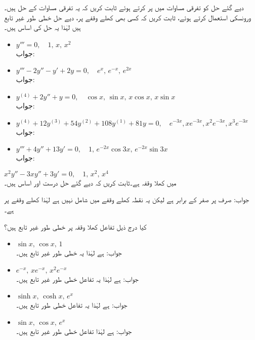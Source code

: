 دیے گئے حل کو تفرقی مساوات میں پر کرتے ہوئے ثابت کریں کہ یہ تفرقی مساوات کے حل ہیں۔ورونسکی استعمال کرتے ہوئے، ثابت کریں کہ کسی بھی کھلے وقفے پر،  دیے حل خطی طور غیر تابع ہیں لہٰذا یہ حل کی اساس ہیں۔
\begin{itemize}
\item
$y'''=0,\quad 1,\, x,\, x^2$\\
جواب: 
\item
$y'''-2y''-y'+2y=0,\quad e^{x},\,  e^{-x},\, e^{2x}$\\
جواب:
\item
$y^{(4)}+2y''+y=0,\quad \cos x,\, \sin x,\, x\cos x,\, x\sin x$\\
جواب:
\item
$y^{(4)}+12y^{(3)}+54y^{(2)}+108y^{(1)}+81y=0, \quad e^{-3x},xe^{-3x},x^2e^{-3x},x^3e^{-3x}$\\
جواب:
\item
$y'''+4y''+13y'=0,\quad 1, \, e^{-2x}\cos 3x, \, e^{-2x} \sin 3x$\\
جواب:
\end{itemize}
\quad 
$x^2y''-3xy''+3y'=0,\quad 1,\, x^2,\,x^4$\\
میں  کھلا وقفہ  ہے۔ثابت کریں کہ دیے گئے حل درست  اور اساس ہیں۔

جواب: صرف  پر صفر کے برابر ہے لیکن یہ نقطہ کھلے وقفے میں شامل نہیں ہے لہٰذا کھلے وقفے پر  ہے۔

کیا درج ذیل تفاعل کھلا وقفہ  پر خطی طور غیر تابع ہیں؟
\begin{itemize}

\item
$\sin x, \, \cos x, \, 1$\\
جواب: ہے لہٰذا یہ خطی طور غیر تابع ہیں۔
\item
$e^{-x},\, xe^{-x}, \, x^2e^{-x}$\\
جواب: ہے لہٰذا یہ تفاعل خطی طور غیر تابع ہیں۔
\item
$\sinh x, \, \cosh x, \, e^{x}$\\
جواب: ہے لہٰذا یہ تفاعل خطی طور تابع ہیں۔
\item
$\sin x, \, \cos x, \, e^x$\\
جواب: ہے لہٰذا تفاعل خطی طور غیر تابع ہیں۔
\end{itemize}


